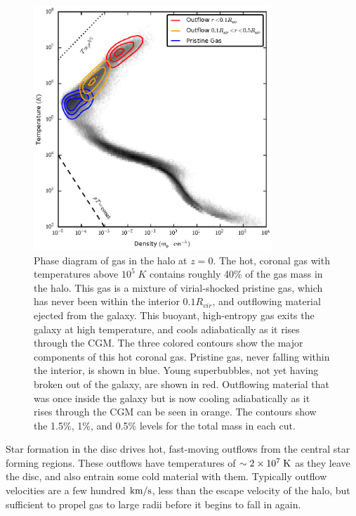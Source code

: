 \begin{figure}
    \includegraphics[width=0.8\textwidth]{figures2/phase.eps}
    \caption[Gas phase diagram for g1536]{Phase diagram of gas in the halo at $z=0$.  The hot, coronal gas
        with temperatures above $10^5\;K$ contains roughly 40\% of the gas mass
        in the halo.  This gas is a mixture of virial-shocked pristine gas,
        which has never been within the interior $0.1R_{vir}$, and outflowing
        material ejected from the galaxy.  This buoyant, high-entropy gas exits
        the galaxy at high temperature, and cools adiabatically as it rises
        through the CGM.  The three colored contours show the major components
        of this hot coronal gas.  Pristine gas, never falling within the
        interior, is shown in blue.  Young superbubbles, not yet having broken out
        of the galaxy, are shown in red.  Outflowing material that was once inside the
        galaxy but is now cooling adiabatically as it rises through the CGM can be seen
        in orange.  The contours show the 1.5\%, 1\%, and 0.5\% levels for the
        total mass in each cut.}
        \label{phase2}
\end{figure}
Star formation in the disc drives hot, fast-moving outflows from the central star
forming regions.  These outflows have temperatures of $\sim2\times10^7\; \rm{K}$
as they leave the disc, and also entrain some cold material with them.
Typically outflow velocities are a few hundred $\rm{km/s}$, less than the
escape velocity of the halo, but sufficient to propel gas to large radii before
it begins to fall in again.  

